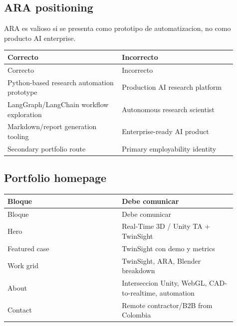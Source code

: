 \subsection{ARA positioning}


ARA es valioso si se presenta como prototipo de automatizacion, no como producto AI enterprise.


\begin{center}
\scriptsize
\begin{longtable}{>{\raggedright\arraybackslash}p{0.455\linewidth} >{\raggedright\arraybackslash}p{0.455\linewidth}}
\toprule
Correcto & Incorrecto \\
\midrule
\endfirsthead
\toprule
Correcto & Incorrecto \\
\midrule
\endhead
Python-based research automation prototype & Production AI research platform \\
LangGraph/LangChain workflow exploration & Autonomous research scientist \\
Markdown/report generation tooling & Enterprise-ready AI product \\
Secondary portfolio route & Primary employability identity \\
\bottomrule
\end{longtable}
\end{center}


\subsection{Portfolio homepage}


\begin{center}
\scriptsize
\begin{longtable}{>{\raggedright\arraybackslash}p{0.455\linewidth} >{\raggedright\arraybackslash}p{0.455\linewidth}}
\toprule
Bloque & Debe comunicar \\
\midrule
\endfirsthead
\toprule
Bloque & Debe comunicar \\
\midrule
\endhead
Hero & Real-Time 3D / Unity TA + TwinSight \\
Featured case & TwinSight con demo y metrics \\
Work grid & TwinSight, ARA, Blender breakdown \\
About & Interseccion Unity, WebGL, CAD-to-realtime, automation \\
Contact & Remote contractor/B2B from Colombia \\
\bottomrule
\end{longtable}
\end{center}


